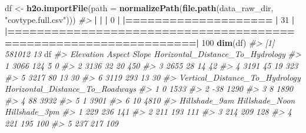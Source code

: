 \documentclass[]{book}
\newenvironment{Shaded}{\begin{snugshade}}{\end{snugshade}}
\newcommand{\CommentTok}[1]{\textcolor[rgb]{0.56,0.35,0.01}{\textit{#1}}}
\newcommand{\DataTypeTok}[1]{\textcolor[rgb]{0.13,0.29,0.53}{#1}}
\newcommand{\DecValTok}[1]{\textcolor[rgb]{0.00,0.00,0.81}{#1}}
\newcommand{\ErrorTok}[1]{\textcolor[rgb]{0.64,0.00,0.00}{\textbf{#1}}}
\newcommand{\KeywordTok}[1]{\textcolor[rgb]{0.13,0.29,0.53}{\textbf{#1}}}
\newcommand{\NormalTok}[1]{#1}
\newcommand{\OperatorTok}[1]{\textcolor[rgb]{0.81,0.36,0.00}{\textbf{#1}}}
\newcommand{\StringTok}[1]{\textcolor[rgb]{0.31,0.60,0.02}{#1}}
\begin{document}
\begin{Shaded}
\begin{Highlighting}[]
\NormalTok{df <-}\StringTok{ }\KeywordTok{h2o.importFile}\NormalTok{(}\DataTypeTok{path =} \KeywordTok{normalizePath}\NormalTok{(}\KeywordTok{file.path}\NormalTok{(data_raw_dir, }\StringTok{"covtype.full.csv"}\NormalTok{)))}
\CommentTok{#> }
  \OperatorTok{|}\StringTok{                                                                       }
\StringTok{  }\ErrorTok{|}\StringTok{                                                                 }\ErrorTok{|}\StringTok{   }\DecValTok{0}\NormalTok{%}
  \OperatorTok{|}\StringTok{                                                                       }
\StringTok{  }\ErrorTok{|====================}\StringTok{                                             }\ErrorTok{|}\StringTok{  }\DecValTok{31}\NormalTok{%}
  \OperatorTok{|}\StringTok{                                                                       }
\StringTok{  }\ErrorTok{|=================================================================|}\StringTok{ }\DecValTok{100}\NormalTok{%}
\KeywordTok{dim}\NormalTok{(df)}
\CommentTok{#> [1] 581012     13}
\NormalTok{df}
\CommentTok{#>   Elevation Aspect Slope Horizontal_Distance_To_Hydrology}
\CommentTok{#> 1      3066    124     5                                0}
\CommentTok{#> 2      3136     32    20                              450}
\CommentTok{#> 3      2655     28    14                               42}
\CommentTok{#> 4      3191     45    19                              323}
\CommentTok{#> 5      3217     80    13                               30}
\CommentTok{#> 6      3119    293    13                               30}
\CommentTok{#>   Vertical_Distance_To_Hydrology Horizontal_Distance_To_Roadways}
\CommentTok{#> 1                              0                            1533}
\CommentTok{#> 2                            -38                            1290}
\CommentTok{#> 3                              8                            1890}
\CommentTok{#> 4                             88                            3932}
\CommentTok{#> 5                              1                            3901}
\CommentTok{#> 6                             10                            4810}
\CommentTok{#>   Hillshade_9am Hillshade_Noon Hillshade_3pm}
\CommentTok{#> 1           229            236           141}
\CommentTok{#> 2           211            193           111}
\CommentTok{#> 3           214            209           128}
\CommentTok{#> 4           221            195           100}
\CommentTok{#> 5           237            217           109}
}}}
\end{Highlighting}
\end{Shaded}
\end{document}
